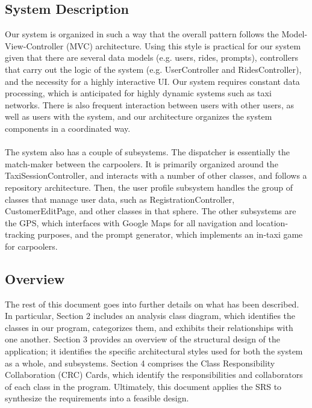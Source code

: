 \documentclass[]{article}
\begin{document}
\subsection{System Description}
\label{sub:system_description}
Our system is organized in such a way that the overall pattern follows the Model-View-Controller (MVC) architecture. Using this style is practical for our system given that there are several data models (e.g. users, rides, prompts), controllers that carry out the logic of the system (e.g. UserController and RidesController), and the necessity for a highly interactive UI. Our system requires constant data processing, which is anticipated for highly dynamic systems such as taxi networks. There is also frequent interaction between users with other users, as well as users with the system, and our architecture organizes the system components in a coordinated way.\\\\
The system also has a couple of subsystems. The dispatcher is essentially the match-maker between the carpoolers. It is primarily organized around the TaxiSessionController, and interacts with a number of other classes, and follows a repository architecture. Then, the user profile subsystem handles the group of classes that manage user data, such as RegistrationController, CustomerEditPage, and other classes in that sphere. The other subsystems are the GPS, which interfaces with Google Maps for all navigation and location-tracking purposes, and the prompt generator, which implements an in-taxi game for carpoolers.


\subsection{Overview}
\label{sub:overview}
The rest of this document goes into further details on what has been described. In particular, Section 2 includes an analysis class diagram, which identifies the classes in our program, categorizes them, and exhibits their relationships with one another. Section 3 provides an overview of the structural design of the application; it identifies the specific architectural styles used for both the system as a whole, and subsystems. Section 4 comprises the Class Responsibility Collaboration (CRC) Cards, which identify the responsibilities and collaborators of each class in the program. Ultimately, this document applies the SRS to synthesize the requirements into a feasible design.
\end{document}
